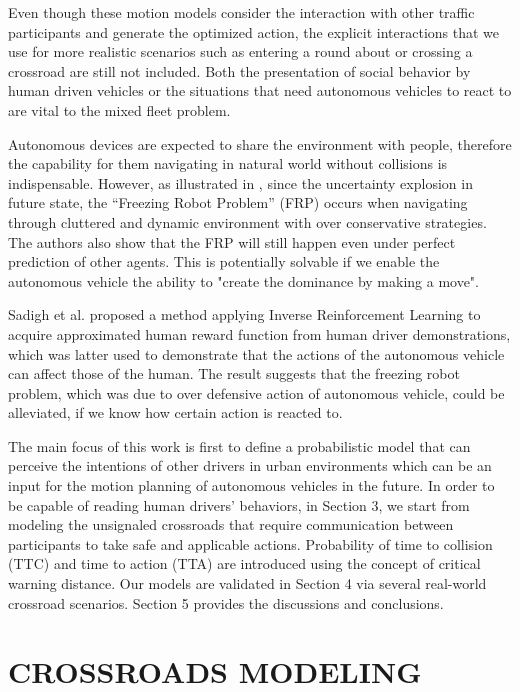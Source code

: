 \documentclass[twocolumn,10pt]{asme2e}
\begin{document}
Even though these motion models consider the interaction with other traffic participants and generate the optimized action, the explicit interactions that we use for more realistic scenarios such as entering a round about or crossing a crossroad are still not included. Both the presentation of social behavior by human driven vehicles or the situations that need autonomous vehicles to react to are vital to the mixed fleet problem. 

 Autonomous devices are expected to share the environment with people, therefore the capability for them navigating in natural world without collisions is indispensable. However, as illustrated in \cite{trautman}, since the uncertainty explosion in future state, the “Freezing Robot Problem” (FRP) occurs when navigating through cluttered and dynamic environment with over conservative strategies. The authors also show that the FRP will still happen even under perfect prediction of other agents. This is potentially solvable if we enable the autonomous vehicle the ability to "create the dominance by making a move".


Sadigh et al. \cite{leverage} proposed a method applying Inverse Reinforcement Learning to acquire approximated human reward function from human driver demonstrations, which was latter used to demonstrate that the actions of the autonomous vehicle can affect those of the human. The result suggests that the freezing robot problem, which was due to over defensive action of autonomous vehicle, could be alleviated, if we know how certain action is reacted to.

The main focus of this work is first to define a probabilistic model that can perceive the intentions of other drivers in urban environments which can be an input for the motion planning of autonomous vehicles in the future. In order to be capable of reading human drivers' behaviors, in Section 3, we start from modeling the unsignaled crossroads that require communication between participants to take safe and applicable actions. Probability of time to collision (TTC) and time to action (TTA) are introduced using the concept of critical warning distance. Our models are validated in Section 4 via several real-world crossroad scenarios. Section 5 provides the discussions and conclusions.

\section{CROSSROADS MODELING}
\end{document}
